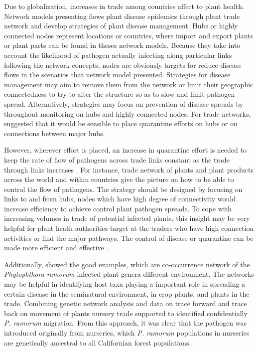 Due to globalization, increases in trade among countries affect to plant health. Network models presenting flows plant disease epidemics through plant trade network and develop strategies of plant disease management. Hubs or highly connected nodes represent locations or countries, where import and export plants or plant parts can be found in theses network models. Because they take into account the likelihood of pathogen actually infecting along particular links following the network concepts, nodes are obviously targets for reduce disease flows in the scenarios that network model presented. Strategies for disease management may aim to remove them from the network or limit their geographic connectedness to try to alter the structure so as to slow and limit pathogen spread. Alternatively, strategies may focus on prevention of disease spreads by throughout monitoring on hubs and highly connected nodes. For trade networks,  suggested that it would be sensible to place quarantine efforts on hubs or on connections between major hubs.

However, wherever effort is placed, an increase in quarantine effort is needed to keep the rate of flow of pathogens across trade links constant as the trade through links increases . For instance, trade network of plants and plant products across the world and within countries give the picture on how to be able to control the flow of pathogens. The strategy should be designed by focusing on links to and from hubs, nodes which have high degree of connectivity would increase efficiency to achieve control plant pathogen spreads. To cope with increasing volumes in trade of potential infected plants, this insight may be very helpful for plant heath authorities target at the traders who have high connection activities or find the major pathways. The control of disease or quarantine can be made more efficient and effective .

Additionally,  showed the good examples, which are co-occurrence network of the \textit{Phytophthora ramorum} infected plant genera different environment. The networks may be helpful in identifying host taxa playing a important role in spreading a certain disease in the seminatural environment, in crop plants, and plants in the trade. Combining genetic network analysis and data on trace forward and trace back on movement of plants nursery trade supported to identified confidentially \textit{P. ramorum} migration. From this approach, it was clear that the pathogen was introduced originally from nurseries, which \textit{P. ramorum} populations in nurseries are genetically ancestral to all Californian forest populations.

